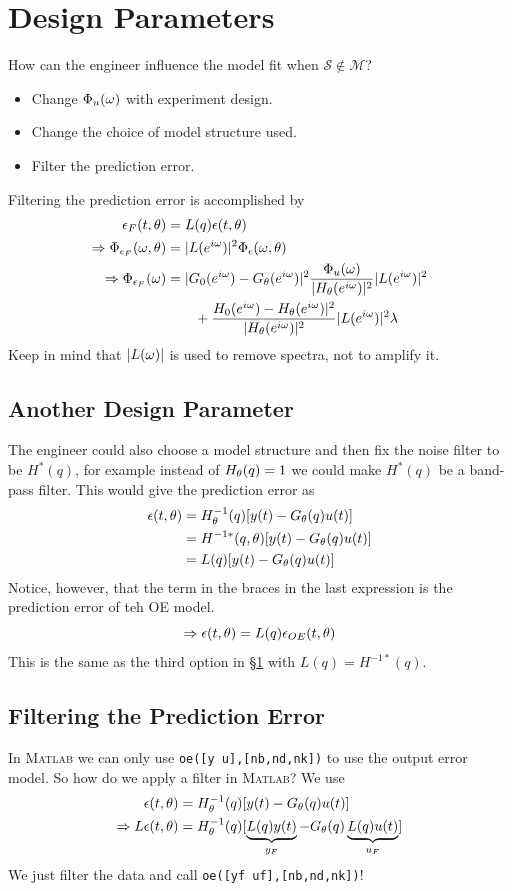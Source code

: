 \section{Design Parameters}
\label{sec:16dp}
How can the engineer influence the model fit when $\mathcal{S}\notin\mathcal{M}$?
\begin{itemize}
\item Change $\Phi_u(\omega)$ with experiment design.
\item Change the choice of model structure used.
\item Filter the prediction error.
\end{itemize}
Filtering the prediction error is accomplished by
\begin{align*}
\epsilon_F(t,\theta) &= L(q)\epsilon(t,\theta) \\
\Rightarrow \Phi_{\epsilon_F}(\omega,\theta) &= |L(e^{i\omega})|^2\Phi_\epsilon(\omega,\theta) \\
\Rightarrow \Phi_{\epsilon_F}(\omega) &= |G_0(e^{i\omega}) - G_\theta(e^{i\omega})|^2\frac{\Phi_u(\omega)}{|H_\theta(e^{i\omega})|^2}|L(e^{i\omega})|^2 \\
&\qquad + \frac{H_0(e^{i\omega}) - H_\theta(e^{i\omega})|^2}{|H_\theta(e^{i\omega})|^2}|L(e^{i\omega})|^2\lambda
\end{align*}
Keep in mind that $|L(\omega)|$ is used to remove spectra, not to amplify it.

\subsection{Another Design Parameter}
The engineer could also choose a model structure and then fix the noise filter to be $H^\ast(q)$, for example instead of $H_\theta(q)=1$ we could make $H^\ast(q)$ be a band-pass filter. This would give the prediction error as
\begin{align*}
\epsilon(t,\theta) &= H_\theta^{-1}(q)[y(t)-G_\theta(q) u(t)] \\
&= H^{-1\ast}(q,\theta)[y(t) - G_\theta(q) u(t)] \\
&= L(q)[y(t) - G_\theta(q) u(t)]
\end{align*}
Notice, however, that the term in the braces in the last expression is the prediction error of teh OE model.
$$\Rightarrow \epsilon(t,\theta) = L(q)\epsilon_{OE}(t,\theta)$$
This is the same as the third option in \S\ref{sec:16dp} with $L(q)=H^{-1\ast}(q)$.

\subsection{Filtering the Prediction Error}
In \textsc{Matlab} we can only use \texttt{oe([y u],[nb,nd,nk])} to use the output error model. So how do we apply a filter in \textsc{Matlab}? We use
\begin{align*}
\epsilon(t,\theta) &= H_\theta^{-1}(q)[y(t)-G_\theta(q) u(t)] \\
\Rightarrow L\epsilon(t,\theta) &= H_\theta^{-1}(q)[\underbrace{L(q)y(t)}_{y_F} - G_\theta(q) \underbrace{L(q)u(t)}_{u_F}]
\end{align*}
We just filter the data and call \texttt{oe([yf uf],[nb,nd,nk])}!

